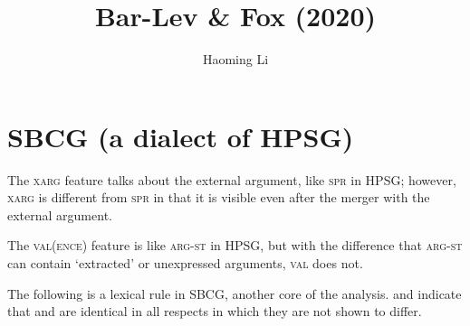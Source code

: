 \documentclass[11pt]{article}
\title{Bar-Lev \& Fox (2020)}
\author{Haoming Li}
\begin{document}
\section{SBCG (a dialect of HPSG)}
\label{sec:sbcg_a_dialect_of_hpsg}




The \textsc{xarg} feature talks about the external argument, like \textsc{spr} in HPSG; however, \textsc{xarg} is different from \textsc{spr} in that it is visible even after the merger with the external argument.

The \textsc{val(ence)} feature is like \textsc{arg-st} in HPSG, but with the difference that \textsc{arg-st} can contain `extracted' or unexpressed arguments, \textsc{val} does not.



The following is a lexical rule in SBCG, another core of the analysis.
 and  indicate that \avm{[A]} and \avm{[B]} are identical in all respects in which they are not shown to differ.
\end{document}
